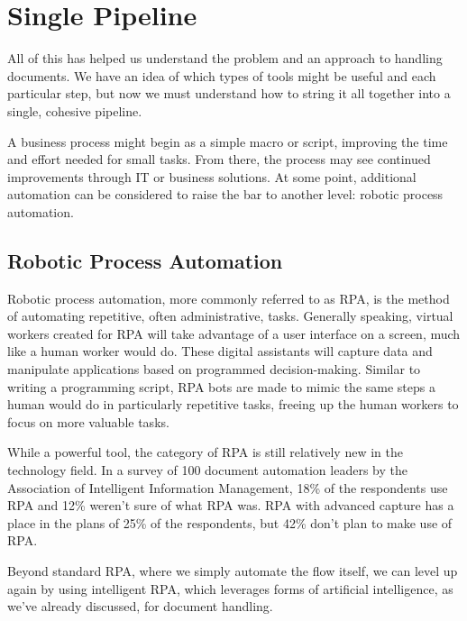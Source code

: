 \documentclass[conference, draftcls]{IEEEtran}
\begin{document}
\section{Single Pipeline} \label{sectionSinglePipeline}
All of this has helped us understand the problem and an approach to handling documents. We have an idea of which types of tools might be useful and each particular step, but now we must understand how to string it all together into a single, cohesive pipeline.

A business process might begin as a simple macro or script, improving the time and effort needed for small tasks. From there, the process may see continued improvements through IT or business solutions. At some point, additional automation can be considered to raise the bar to another level: robotic process automation.

\subsection{Robotic Process Automation}
Robotic process automation, more commonly referred to as RPA, is the method of automating repetitive, often administrative, tasks. Generally speaking, virtual workers created for RPA will take advantage of a user interface on a screen, much like a human worker would do. These digital assistants will capture data and manipulate applications based on programmed decision-making. Similar to writing a programming script, RPA bots are made to mimic the same steps a human would do in particularly repetitive tasks, freeing up the human workers to focus on more valuable tasks.

While a powerful tool, the category of RPA is still relatively new in the technology field. In a survey of 100 document automation leaders by the Association of Intelligent Information Management, 18\% of the respondents use RPA and 12\% weren't sure of what RPA was. RPA with advanced capture has a place in the plans of 25\% of the respondents, but 42\% don't plan to make use of RPA. \cite{hollander2019survey}

Beyond standard RPA, where we simply automate the flow itself, we can level up again by using intelligent RPA, which leverages forms of artificial intelligence, as we've already discussed, for document handling.
\end{document}
